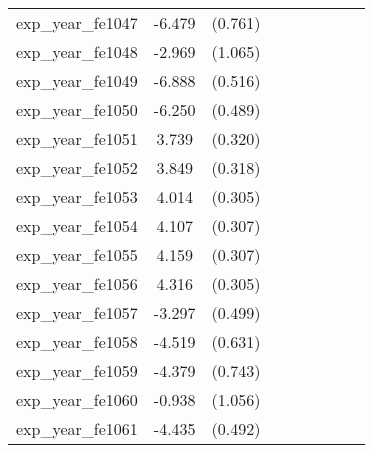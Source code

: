 {\begin{tabular}{l*{4}{cc}}
exp\_year\_fe1047&   -6.479\sym{***}&  (0.761)&                  &         &                  &         &                  &         \\
exp\_year\_fe1048&   -2.969\sym{**} &  (1.065)&                  &         &                  &         &                  &         \\
exp\_year\_fe1049&   -6.888\sym{***}&  (0.516)&                  &         &                  &         &                  &         \\
exp\_year\_fe1050&   -6.250\sym{***}&  (0.489)&                  &         &                  &         &                  &         \\
exp\_year\_fe1051&    3.739\sym{***}&  (0.320)&                  &         &                  &         &                  &         \\
exp\_year\_fe1052&    3.849\sym{***}&  (0.318)&                  &         &                  &         &                  &         \\
exp\_year\_fe1053&    4.014\sym{***}&  (0.305)&                  &         &                  &         &                  &         \\
exp\_year\_fe1054&    4.107\sym{***}&  (0.307)&                  &         &                  &         &                  &         \\
exp\_year\_fe1055&    4.159\sym{***}&  (0.307)&                  &         &                  &         &                  &         \\
exp\_year\_fe1056&    4.316\sym{***}&  (0.305)&                  &         &                  &         &                  &         \\
exp\_year\_fe1057&   -3.297\sym{***}&  (0.499)&                  &         &                  &         &                  &         \\
exp\_year\_fe1058&   -4.519\sym{***}&  (0.631)&                  &         &                  &         &                  &         \\
exp\_year\_fe1059&   -4.379\sym{***}&  (0.743)&                  &         &                  &         &                  &         \\
exp\_year\_fe1060&   -0.938         &  (1.056)&                  &         &                  &         &                  &         \\
exp\_year\_fe1061&   -4.435\sym{***}&  (0.492)&                  &         &                  &         &                  &         \\

\end{tabular}}
